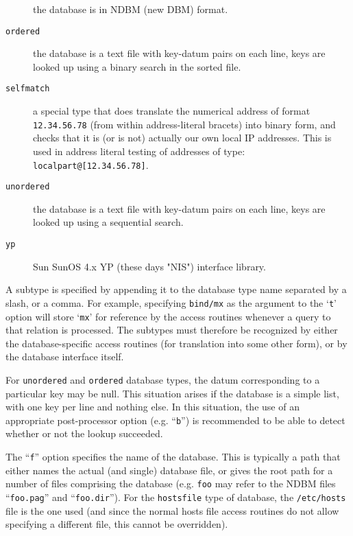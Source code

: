 \begin{description}
the database is in NDBM (new DBM) format.

\item[{\tt ordered}] \mbox{}

the database is a text file with key-datum pairs on each line, keys are looked up using a binary search in the sorted file.

\item[{\tt selfmatch}] \mbox{}

a special type that does translate the numerical address of format
\verb/12.34.56.78/ (from within address-literal bracets) into binary
form, and checks that it is (or is not) actually our own local IP addresses.
This is used in address literal testing of addresses of type:
\verb/localpart@[12.34.56.78]/.

\item[{\tt unordered}] \mbox{}

the database is a text file with key-datum pairs on each line, keys are looked up using a sequential search.

\item[{\tt yp}] \mbox{}

Sun SunOS 4.x YP (these days "NIS") interface library.

\end{description}


A subtype is specified by appending it to the database type name separated
by a slash, or a comma.
For example, specifying {\tt bind/mx} as the argument to the `{\tt t}' option
will store `{\tt mx}' for reference by the access routines whenever a query
to that relation is processed.
The subtypes must therefore be recognized by either the database-specific
access routines (for translation into some other form), or by the database
interface itself.

For {\tt unordered} and {\tt ordered} database types, the datum 
corresponding to a particular key may be null.  This situation arises if 
the database is a simple list, with one key per line and nothing else.  
In this situation, the use of an appropriate post-processor option 
(e.g. ``{\tt b}'') is recommended to be able to detect whether or not 
the lookup succeeded.

The ``{\tt f}'' option specifies the name of the database.  This is typically a
path that either names the actual (and single) database file, or gives the
root path for a number of files comprising the database (e.g. {\tt foo} may
refer to the NDBM files ``{\tt foo.pag}'' and ``{\tt foo.dir}'').  For the 
{\tt hostsfile} type of database, the {\tt /etc/hosts} file is the one 
used (and since the normal hosts file access routines do not allow specifying 
a different file, this cannot be overridden).

